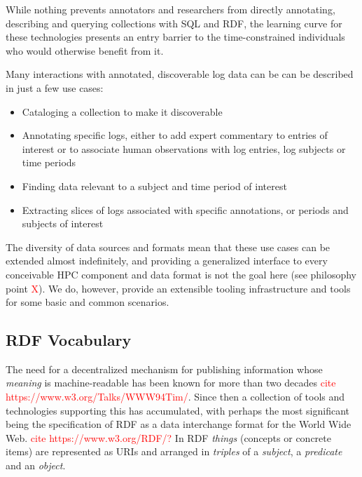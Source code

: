 \begin{enumerate}
      While nothing prevents annotators and researchers from directly 
      annotating, describing and querying collections with SQL and RDF, 
      the learning curve for these technologies presents an entry 
      barrier to the time-constrained individuals who would otherwise
      benefit from it. 
      
      Many interactions with annotated, discoverable log data can be 
      can be described in just a few use cases:
      
\begin{itemize}
\item Cataloging a collection to make it discoverable
\item Annotating specific logs, either to add expert commentary to 
      entries of interest or to associate human observations with log 
      entries, log subjects or time periods
\item Finding data relevant to a subject and time period of interest
\item Extracting slices of logs associated with specific annotations, 
      or periods and subjects of interest
\end{itemize}

     The diversity of data sources and formats mean that these use cases 
     can be extended almost indefinitely, and providing a generalized 
     interface to every conceivable HPC component and data format is 
     not the goal here (see philosophy point \textcolor{red}{X}). We 
     do, however, provide an extensible tooling infrastructure and tools
     for some basic and common scenarios.

\end{enumerate}

\subsection{RDF Vocabulary}

The need for a decentralized mechanism for publishing information whose 
\emph{meaning} is machine-readable has been known for more than two decades
\textcolor{red}{cite https://www.w3.org/Talks/WWW94Tim/}. Since then a 
collection of tools and technologies supporting this has accumulated, with
perhaps the most significant being the specification of RDF as a data 
interchange format for the World Wide Web. \textcolor{red}{cite https://www.w3.org/RDF/?}
In RDF \emph{things} (concepts or concrete items) are represented as URIs
and arranged in \emph{triples} of a \emph{subject}, a \emph{predicate} and 
an \emph{object}. 

